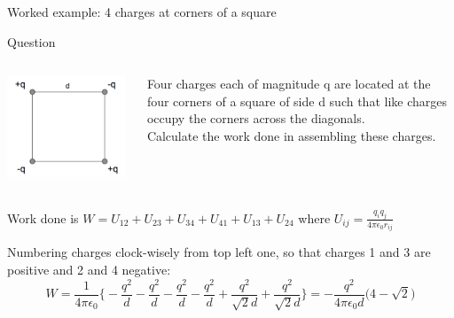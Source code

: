 {
\problemslide

%
%
%

\begin{frame}{Worked example: 4 charges at corners of a square }

\begin{blockexmplque}{Question}
\begin{columns}
  \begin{column}{0.25\textwidth}
   \begin{center}
     \includegraphics[width=0.98\textwidth]{./images/problems/lect2_array_of_4_charges.png}
   \end{center}
  \end{column}
  \begin{column}{0.75\textwidth}
     Four charges each of magnitude q are located at the four corners of a
     square of side d such that like charges occupy the corners across
     the diagonals. \\
    Calculate the work done in assembling these charges.
  \end{column}
\end{columns}
\end{blockexmplque}

\vspace{0.1cm}

Work done is
$\displaystyle W = U_{12} + U_{23} + U_{34} + U_{41} + U_{13} + U_{24}$
where $\displaystyle U_{ij} =  \frac{q_i q_j}{4\pi \epsilon_0 r_{ij}}$

Numbering charges clock-wisely from top left one,
so that charges 1 and 3 are positive and 2 and 4 negative:
\begin{equation*}
  W = \frac{1}{4\pi \epsilon_0}
    \bigg\{
        - \frac{q^2}{d} -  \frac{q^2}{d} -  \frac{q^2}{d} -  \frac{q^2}{d} +  \frac{q^2}{\sqrt{2}d} + \frac{q^2}{\sqrt{2}d}
     \bigg\} =
     -\frac{q^2}{4\pi \epsilon_0 d} \Big( 4 - \sqrt{2} \Big)
\end{equation*}

\end{frame}

} %


